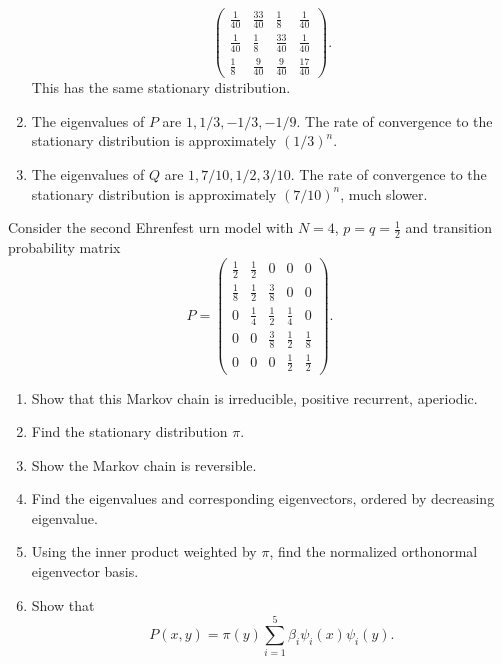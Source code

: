 \documentclass[12pt]{article}
\begin{document}
\begin{solution}
\begin{enumerate}[label=(\alph*)]
\[\begin{pmatrix}
                \frac{1}{40} & \frac{33}{40} & \frac{1}{8} & \frac{1}{40}\\
                \frac{1}{40} & \frac{1}{8} & \frac{33}{40} & \frac{1}{40}\\
                \frac{1}{8} & \frac{9}{40} & \frac{9}{40} & \frac{17}{40}
            \end{pmatrix}
            .
        \] This has the same stationary distribution.
    \item
        The eigenvalues of \( P \) are \( 1, 1/3, -1/3, -1/9 \).  The
        rate of convergence to the stationary distribution is
        approximately \( (1/3)^n \).
    \item
        The eigenvalues of \( Q \) are \( 1, 7/10, 1/2, 3/10 \).  The
        rate of convergence to the stationary distribution is
        approximately \( (7/10)^n \), much slower.
\end{enumerate}
\end{solution}
\begin{exercise}
    Consider the second Ehrenfest urn model with \( N=4 \), \( p = q =
    \frac{1}{2} \) and transition probability matrix
    \[
        P =
        \begin{pmatrix}
            \frac{1}{2} & \frac{1}{2} & 0 & 0 & 0\\
            \frac{1}{8} & \frac{1}{2} & \frac{3}{8} & 0 & 0\\
            0 & \frac{1}{4} & \frac{1}{2} & \frac{1}{4} & 0\\
            0 & 0 & \frac{3}{8} & \frac{1}{2} & \frac{1}{8}\\
            0 & 0 & 0 & \frac{1}{2} & \frac{1}{2}
        \end{pmatrix}
        .
    \]
    \begin{enumerate}[label=(\alph*)]
    \item
        Show that this Markov chain is irreducible, positive recurrent,
        aperiodic.
    \item
        Find the stationary distribution \( \pi \).
    \item
        Show the Markov chain is reversible.
    \item
        Find the eigenvalues and corresponding eigenvectors, ordered by
        decreasing eigenvalue.
    \item
        Using the inner product weighted by \( \pi \), find the
        normalized orthonormal eigenvector basis.
    \item
        Show that
        \[
            P(x,y) = \pi(y) \sum\limits_{i=1}^{5} \beta_i \psi_i(x) \psi_i
            (y).
        \]
\end{enumerate}
\end{exercise}
\end{document}
